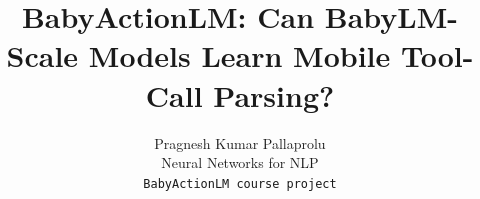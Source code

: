 \documentclass[11pt]{article}
\title{BabyActionLM: Can BabyLM-Scale Models Learn Mobile Tool-Call Parsing?}
\author{
Pragnesh Kumar Pallaprolu \\
Neural Networks for NLP \\
\texttt{BabyActionLM course project}
}
\begin{document}
\maketitle

\begin{abstract}

\end{abstract}










\end{document}
